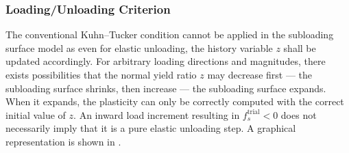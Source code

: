 \subsubsection{Loading/Unloading Criterion}
The conventional Kuhn--Tucker condition cannot be applied in the subloading surface model as even for elastic unloading, the history variable $z$ shall be updated accordingly.
For arbitrary loading directions and magnitudes, there exists possibilities that the normal yield ratio $z$ may decrease first --- the subloading surface shrinks, then increase --- the subloading surface expands.
When it expands, the plasticity can only be correctly computed with the correct initial value of $z$.
An inward load increment resulting in $f_s^\text{trial}<0$ does not necessarily imply that it is a pure elastic unloading step.
A graphical representation is shown in .
